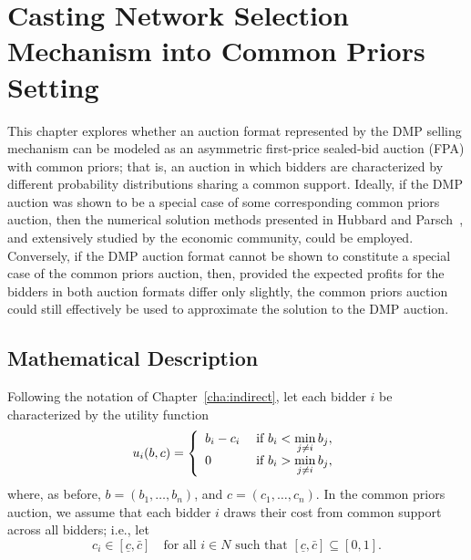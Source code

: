 \chapter{Casting Network Selection Mechanism into Common Priors Setting}
\label{cha:approximation}

\minitoc
\vspace{10mm}

This chapter explores whether an auction format represented by the DMP selling mechanism can be modeled as an asymmetric first-price sealed-bid auction (FPA) with common priors; that is, an auction in which bidders are characterized by different probability distributions sharing a common support. Ideally, if the DMP auction was shown to be a special case of some corresponding common priors auction, then the numerical solution methods presented in Hubbard and Parsch~\cite{HubbardPaarsch2011}, and extensively studied by the economic community, could be employed. Conversely, if the DMP auction format cannot be shown to constitute a special case of the common priors auction, then, provided the expected profits for the bidders in both auction formats differ only slightly, the common priors auction could still effectively be used to approximate the solution to the DMP auction.

\section{Mathematical Description} %
\label{sec:mathematical_description_approximation}

Following the notation of Chapter~\ref{cha:indirect}, let each bidder $i$ be characterized by the utility function
\begin{equation}
  \label{eq:utility_approximation}
    u_i(b,c) = \left\{
  \begin{array}{l l}
    b_i-c_i & \;\text{if } b_i < \displaystyle\min_{j\neq i}b_j,\\
    0 & \;\text{if } b_i > \displaystyle\min_{j\neq i}b_j,
  \end{array}\right.
\end{equation}
where, as before, $b = (b_1,\ldots,b_n)$, and $c = (c_1,\ldots,c_n)$. In the common priors auction, we assume that each bidder $i$ draws their cost from common support across all bidders; i.e., let
\begin{equation*}
  c_i\in [\underline{c}, \bar{c}] \quad\text{for all } i\in N \text{ such that } [\underline{c}, \bar{c}]\subseteq [0, 1].
\end{equation*}

